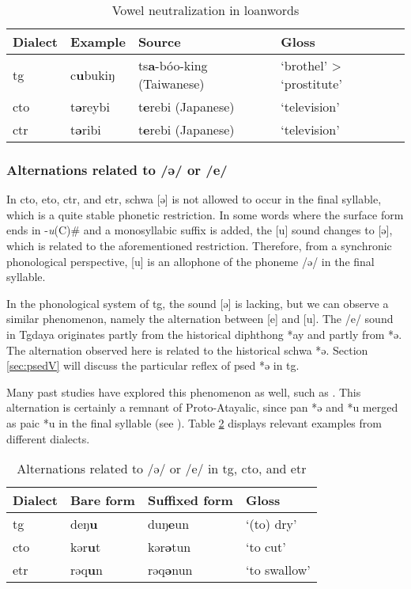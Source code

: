 \begin{table}[!htbp]
\centering
\caption{Vowel neutralization in loanwords}
\label{tab:Vneu_loan}
\begin{tabular}{llll}
\hline
Dialect   & Example & Source                   & Gloss                    \\ \hline
\acl{tg}  & c\textbf{u}bukiŋ & ts\textbf{a}-bóo-king (Taiwanese) & `brothel' > `prostitute' \\
\acl{cto} & t\textbf{ə}reybi & t\textbf{e}rebi (Japanese)        & `television'             \\
\acl{ctr} & t\textbf{ə}ribi  & t\textbf{e}rebi (Japanese)        & `television'                \\ \hline
\end{tabular}
\end{table}

\subsubsection{Alternations related to /ə/ or /e/} \label{sec:eu_alt}

In \acl{cto}, \acl{eto}, \acl{ctr}, and \acl{etr}, schwa [ə] is not allowed to occur in the final syllable, which is a quite stable phonetic restriction. In some words where the surface form ends in -\textit{u}(C)\# and a monosyllabic suffix is added, the [u] sound changes to [ə], which is related to the aforementioned restriction. Therefore, from a synchronic phonological perspective, [u] is an allophone of the phoneme /ə/ in the final syllable. 

In the phonological system of \acl{tg}, the sound [ə] is lacking, but we can observe a similar phenomenon, namely the alternation between [e] and [u]. The /e/ sound in Tgdaya originates partly from the historical diphthong *ay and partly from *ə. The alternation observed here is related to the historical schwa *ə. Section \ref{sec:psedV} will discuss the particular reflex of \acl{psed} *ə in \acl{tg}.

Many past studies have explored this phenomenon as well, such as \textcite{yang1976sedpho,Sung2018Sedgrammar,Lee2018Trugrammar}. This alternation is certainly a remnant of Proto-Atayalic, since \acl{pan} *ə and *u merged as \acl{paic} *u in the final syllable (see \cite{li1981paic}). Table \ref{tab:eu_alt} displays relevant examples from different dialects.

\begin{table}[!htbp]
\centering
\caption{Alternations related to /ə/ or /e/ in \acl{tg}, \acl{cto}, and \acl{etr}}
\label{tab:eu_alt}
\begin{tabular}{llll}
\hline
Dialect   & Bare form & Suffixed form & Gloss        \\ \hline
\acl{tg}  & deŋ\textbf{u}      & duŋ\textbf{e}un        & `(to) dry'   \\
\acl{cto} & kər\textbf{u}t     & kər\textbf{ə}tun       & `to cut'     \\
\acl{etr} & rəq\textbf{u}n     & rəq\textbf{ə}nun       & `to swallow' \\ \hline
\end{tabular}
\end{table}

